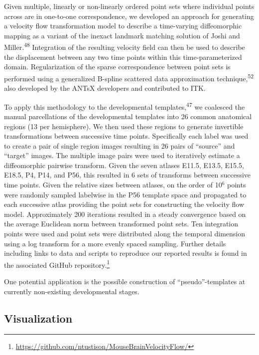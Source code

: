 \documentclass[
  12pt,
]{article}
\begin{document}
Given multiple, linearly or non-linearly ordered point sets where
individual points across are in one-to-one correspondence, we developed
an approach for generating a velocity flow transformation model to
describe a time-varying diffeomorphic mapping as a variant of the
inexact landmark matching solution of Joshi and
Miller.\textsuperscript{48} Integration of the resulting velocity field
can then be used to describe the displacement between any two time
points within this time-parameterized domain. Regularization of the
sparse correspondence between point sets is performed using a
generalized B-spline scattered data approximation
technique,\textsuperscript{52} also developed by the ANTsX developers
and contributed to ITK.

To apply this methodology to the developmental
templates,\textsuperscript{47} we coalesced the manual parcellations of
the developmental templates into 26 common anatomical regions (13 per
hemisphere). We then used these regions to generate invertible
transformations between successive time points. Specifically each label
was used to create a pair of single region images resulting in 26 pairs
of ``source'' and ``target'' images. The multiple image pairs were used
to iteratively estimate a diffeomorphic pairwise transform. Given the
seven atlases E11.5, E13.5, E15.5, E18.5, P4, P14, and P56, this
resulted in 6 sets of transforms between successive time points. Given
the relative sizes between atlases, on the order of 10\(^6\) points were
randomly sampled labelwise in the P56 template space and propagated to
each successive atlas providing the point sets for constructing the
velocity flow model. Approximately 200 iterations resulted in a steady
convergence based on the average Euclidean norm between transformed
point sets. Ten integration points were used and point sets were
distributed along the temporal dimension using a log transform for a
more evenly spaced sampling. Further details including links to data and
scripts to reproduce our reported results is found in the associated
GitHub repository.\footnote{\url{https://github.com/ntustison/MouseBrainVelocityFlow/}}

One potential application is the possible construction of
``pseudo''-templates at currently non-existing developmental stages.

\hypertarget{visualization}{%
\subsection*{Visualization}\label{visualization}}
\end{document}
